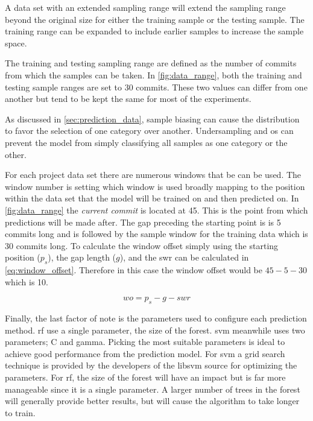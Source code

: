 A data set with an extended sampling range will extend the sampling range beyond the original size for either the training sample or the testing sample. The training range can be expanded to include earlier samples to increase the sample space.

The training and testing sampling range are defined as the number of commits from which the samples can be taken. In \autoref{fig:data_range}, both the training and testing sample ranges are set to 30 commits. These two values can differ from one another but tend to be kept the same for most of the experiments.

As discussed in \autoref{sec:prediction_data}, sample biasing can cause the distribution to favor the selection of one category over another. Undersampling and \gls{os} can prevent the model from simply classifying all samples as one category or the other.

For each project data set there are numerous windows that be can be used. The window number is setting which window is used broadly mapping to the position within the data set that the model will be trained on and then predicted on. In \autoref{fig:data_range} the \textit{current commit} is located at 45. This is the point from which predictions will be made after. The gap preceding the starting point is is 5 commits long and is followed by the sample window for the training data which is 30 commits long. To calculate the window offset simply using the starting position ($p_s$), the gap length ($g$), and the \gls{swr} can be calculated in \autoref{eq:window_offset}. Therefore in this case the window offset would be $45 - 5 - 30$ which is 10.

\begin{equation} 
\label{eq:window_offset}
wo = p_s - g - swr 
\end{equation}

Finally, the last factor of note is the parameters used to configure each prediction method. \gls{rf} use a single parameter, the size of the forest. \gls{svm} meanwhile uses two parameters; C and gamma. Picking the most suitable parameters is ideal to achieve good performance from the prediction model. For \gls{svm} a grid search technique is provided by the developers of the libsvm source %
for optimizing the parameters. For \gls{rf}, the size of the forest will have an impact but is far more manageable since it is a single parameter. A larger number of trees in the forest will generally provide better results, but will cause the algorithm to take longer to train.

